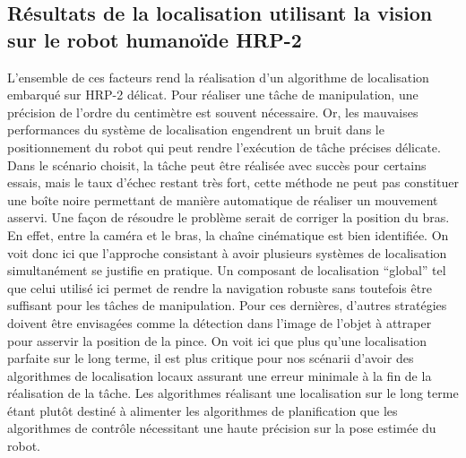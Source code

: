\subsection{Résultats de la localisation utilisant la vision sur le robot humanoïde HRP-2}

L'ensemble de ces facteurs rend la réalisation d'un algorithme de
localisation embarqué sur HRP-2 délicat. Pour réaliser
une tâche de manipulation, une précision de l'ordre du centimètre est
souvent nécessaire. Or, les mauvaises performances du système de
localisation engendrent un bruit dans le positionnement du robot qui
peut rendre l'exécution de tâche précises délicate. Dans le scénario
choisit, la tâche peut être réalisée avec succès pour certains essais,
mais le taux d'échec restant très fort, cette méthode ne peut pas
constituer une boîte noire permettant de manière automatique de
réaliser un mouvement asservi. Une façon de résoudre le problème
serait de corriger la position du bras. En effet, entre la caméra et
le bras, la chaîne cinématique est bien identifiée. On voit donc ici
que l'approche consistant à avoir plusieurs systèmes de localisation
simultanément se justifie en pratique. Un composant de localisation
``global'' tel que celui utilisé ici permet de rendre la navigation
robuste sans toutefois être suffisant pour les tâches de
manipulation. Pour ces dernières, d'autres stratégies doivent être
envisagées comme la détection dans l'image de l'objet à attraper pour
asservir la position de la pince. On voit ici que plus qu'une
localisation parfaite sur le long terme, il est plus critique pour nos
scénarii d'avoir des algorithmes de localisation locaux assurant une
erreur minimale à la fin de la réalisation de la tâche. Les
algorithmes réalisant une localisation sur le long terme étant plutôt
destiné à alimenter les algorithmes de planification que les
algorithmes de contrôle nécessitant une haute précision sur la pose
estimée du robot.




